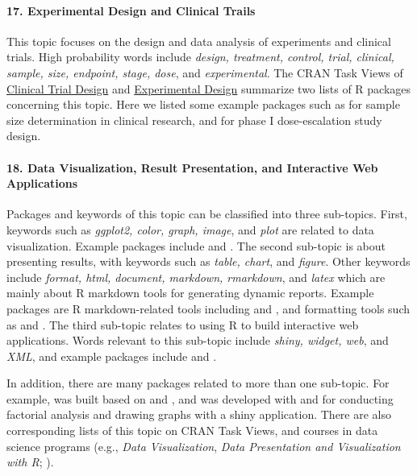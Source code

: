 \paragraph{17. Experimental Design and Clinical Trails} This topic focuses on the design and data analysis of experiments and clinical trials. High probability words include {\it design, treatment, control, trial, clinical, sample, size, endpoint, stage, dose}, and {\it experimental}. The CRAN Task Views of \href{https://cran.r-project.org/web/views/ClinicalTrials.html}{Clinical Trial Design} and \href{https://cran.r-project.org/web/views/ExperimentalDesign.html}{Experimental Design} summarize two lists of R packages concerning this topic. Here we listed some example packages such as  for sample size determination in clinical research, and  for phase I dose-escalation study design.

\paragraph{18. Data Visualization, Result Presentation, and Interactive Web Applications} Packages and keywords of this topic can be classified into three sub-topics. First, keywords such as {\it ggplot2, color, graph, image}, and {\it plot} are related to data visualization. Example packages include  and .  The second sub-topic is about presenting results, with keywords such as {\it table, chart}, and {\it figure}. Other keywords include {\it format, html, document, markdown, rmarkdown}, and {\it latex} which are mainly about R markdown tools for generating dynamic reports. Example packages are R markdown-related tools including  and , and formatting tools such as  and . The third sub-topic relates to using R to build interactive web applications. Words relevant to this sub-topic include {\it shiny, widget, web}, and {\it XML}, and example packages include  and .

In addition, there are many packages related to more than one sub-topic. For example,  was built based on  and , and  was developed with  and  for conducting factorial analysis and drawing graphs with a shiny application. There are also corresponding lists of this topic on CRAN Task Views, and courses in data science programs (e.g., {\it Data Visualization}, {\it Data Presentation and Visualization with R}; \citealp{zhang2021data}). 

